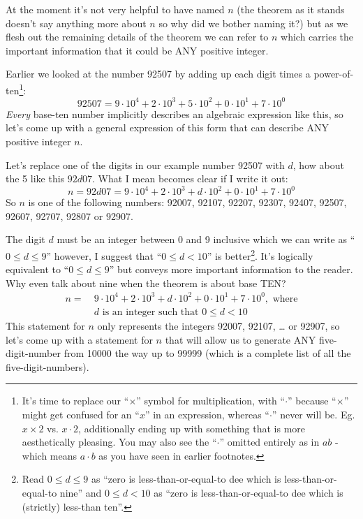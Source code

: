 \documentclass{article}
\begin{document}
At the moment it's not very helpful to have named $n$ (the theorem as it stands
doesn't say anything more about $n$ so why did we bother naming it?) but
as we flesh out the remaining details of the theorem
we can refer to $n$ which carries the important information that it could be ANY positive integer.

Earlier we looked at the number 92507 by adding up
each digit times a power-of-ten\footnote{It's time
to replace our ``$\times{}$'' symbol for multiplication, with ``$\cdot{}$''
because ``$\times{}$'' might get confused for an ``$x$'' in an expression,
whereas ``$\cdot{}$'' never will be. Eg. $x\times{}2$
vs. $x\cdot{}2$, additionally ending up with something that is more aesthetically pleasing.
You may also see the ``$\cdot$'' omitted entirely as
in $ab$ - which means $a\cdot{}b$ as you have seen in earlier footnotes.}:
\[92507=9{\cdot}10^4+2{\cdot}10^3+5{\cdot}10^2+0{\cdot}10^1+7{\cdot}10^0\]
\emph{Every} base-ten number implicitly describes an algebraic expression like this, so
let's come up
with a general expression of this form that can describe ANY positive integer $n$.

Let's replace one of the digits in our example number 92507 with $d$, how about the 5 like this $92d07$. What I
mean becomes clear if I write it out:
\[n=92d07=9{\cdot}10^4+2{\cdot}10^3+d{\cdot}10^2+0{\cdot}10^1+7{\cdot}10^0\]
So $n$ is one of the following numbers:
92007,
92107,
92207,
92307,
92407,
92507,
92607,
92707,
92807 or
92907.

The digit $d$ must be an integer between 0 and 9 inclusive 
which we can write as ``$0\le{}d\le{}9$'' however, I suggest that ``$0\le{}d<10$'' is better\footnote{Read 
$0\le{}d\le{}9$ as ``zero is less-than-or-equal-to dee which is less-than-or-equal-to nine''
and $0\le{}d<10$ as ``zero is less-than-or-equal-to dee which is (strictly) less-than ten''.}.
It's logically equivalent to ``$0\le{}d\le{}9$''  but conveys more important information
to the reader. Why even talk about nine when the theorem is about base TEN?
\begin{align*}
n =\ &9{\cdot}10^4+2{\cdot}10^3+d{\cdot}10^2+0{\cdot}10^1+7{\cdot}10^0,\text{ where}\\
&d\text{ is an integer such that }0\le{}d<10
\end{align*}
This statement for $n$ only represents the integers 92007, 92107, \dots{} or 92907, so let's come up
with a statement for $n$ that will allow us to generate ANY five-digit-number from 10000 
the way up to 99999 (which is a complete list of all the five-digit-numbers).
\end{document}
